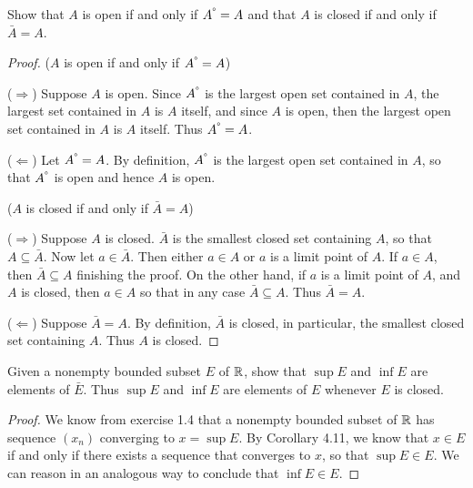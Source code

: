 \begin{exercise}{17}
Show that $A$ is open if and only if $A^\text{\degree}=A$ and that $A$ is closed if and only if $\bar{A}=A$.
\end{exercise}
\begin{proof}
($A$ is open if and only if $A^\text{\degree}=A$)

($\Rightarrow$) 
Suppose $A$ is open. 
Since $A^\text{\degree}$ is the largest open set contained in $A$, the largest set contained in $A$ is $A$ itself, and since $A$ is open, then the largest open set contained in $A$ is $A$ itself. 
Thus $A^\text{\degree}=A$.

($\Leftarrow$) 
Let $A^\text{\degree}=A$. 
By definition, $A^\text{\degree}$ is the largest open set contained in $A$, so that $A^\text{\degree}$ is open and hence $A$ is open.

($A$ is closed if and only if $\bar{A}=A$)

($\Rightarrow$) 
Suppose $A$ is closed. 
$\bar{A}$ is the smallest closed set containing $A$, so that $A\subseteq\bar{A}$. 
Now let $a\in\bar{A}$. 
Then either $a\in A$ or $a$ is a limit point of $A$. 
If $a\in A$, then $\bar{A}\subseteq A$ finishing the proof. 
On the other hand, if $a$ is a limit point of $A$, and $A$ is closed, then $a\in A$ so that in any case $\bar{A}\subseteq A$. 
Thus $\bar{A}=A$.

($\Leftarrow$) 
Suppose $\bar{A}=A$. 
By definition, $\bar{A}$ is closed, in particular, the smallest closed set containing $A$. 
Thus $A$ is closed.
\end{proof} 

\begin{exercise}{18}
Given a nonempty bounded subset $E$ of $\R$, show that $\sup E$ and $\inf E$ are elements of $\bar{E}$. 
Thus $\sup E$ and $\inf E$ are elements of $E$ whenever $E$ is closed.
\end{exercise}
\begin{proof}
We know from exercise 1.4 that a nonempty bounded subset of $\R$ has sequence $(x_n)$ converging to $x=\sup E$. 
By Corollary 4.11, we know that $x\in E$ if and only if there exists a sequence that converges to $x$, so that $\sup E\in E$. 
We can reason in an analogous way to conclude that $\inf E\in E$. 
\end{proof} 


